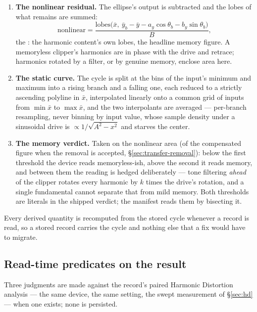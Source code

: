 \documentclass[11pt,a4paper]{article}
\begin{document}
\begin{enumerate}
\item \textbf{The nonlinear residual.} The ellipse's output is subtracted
and the lobes of what remains are summed:
\begin{equation}
  \mathrm{nonlinear} = \frac{\mathrm{lobes}\big(\bar x,\ \bar y_b - \bar y - a_y\cos\theta_b - b_y\sin\theta_b\big)}{B} ,
  \label{eq:nonlinear}
\end{equation}
the : the harmonic content's own lobes, the
headline memory figure. A memoryless clipper's harmonics are in phase with
the drive and retrace; harmonics rotated by a filter, or by genuine memory,
enclose area here.

\item \textbf{The static curve.} The cycle is split at the bins of the
input's minimum and maximum into a rising branch and a falling one, each
reduced to a strictly ascending polyline in $\bar x$, interpolated linearly
onto a common grid of inputs from $\min\bar x$ to $\max\bar x$, and the two
interpolants are averaged --- per-branch resampling, never binning by input
value, whose sample density under a sinusoidal drive is $\propto
1/\sqrt{A^2 - x^2}$ and starves the center.

\item \textbf{The memory verdict.} Taken on the nonlinear area (of the
compensated figure when the removal is accepted, \S\ref{sec:transfer-removal}):
below the first threshold the device reads memoryless-ish, above the second
it reads memory, and between them the reading is hedged deliberately ---
tone filtering \emph{ahead} of the clipper rotates every harmonic by $k$
times the drive's rotation, and a single fundamental cannot separate that
from mild memory. Both thresholds are literals in the shipped verdict; the
manifest reads them by bisecting it.
\end{enumerate}

Every derived quantity is recomputed from the stored cycle whenever a record
is read, so a stored record carries the cycle and nothing else that a fix
would have to migrate.

\subsection{Read-time predicates on the result}
\label{sec:transfer-predicates}
Three judgments are made against the record's paired Harmonic Distortion
analysis --- the same device, the same setting, the swept measurement of
\S\ref{sec:hd} --- when one exists; none is persisted.
\end{document}
